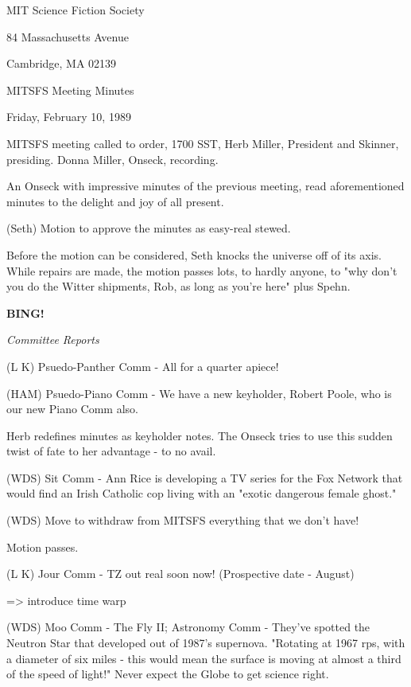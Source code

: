 \documentclass[12pt]{article}
\newcommand{\bing}{{\bf BING!} }
\newcommand{\goto}[1]{\bing \vskip 12pt \centerline{{\em{#1}}}}
\begin{document}
\begin{center}

MIT Science Fiction Society 

84 Massachusetts Avenue

Cambridge, MA 02139

\vspace{12pt}

MITSFS Meeting Minutes 

Friday, February 10, 1989

\end{center}
 
\vspace{18pt}

\setlength{\parskip}{6pt}

\noindent
MITSFS meeting called to order, 1700 SST, Herb Miller, President and Skinner, presiding. Donna Miller, Onseck, recording.

An Onseck with impressive minutes of the previous meeting, read aforementioned minutes to the delight and joy of all present.

(Seth) Motion to approve the minutes as easy-real stewed.  

Before the motion can be considered, Seth knocks the universe off of its axis.  While repairs are made, the motion passes lots, to hardly anyone, to "why don't you do the Witter shipments, Rob, as long as
you're here" plus Spehn.

\goto{Committee Reports}

(L K) Psuedo-Panther Comm - All for a quarter apiece!

(HAM) Psuedo-Piano Comm - We have a new keyholder, Robert Poole, who is our new Piano Comm also.

Herb redefines minutes as keyholder notes. The Onseck tries to use this sudden twist of fate to her advantage - to no avail.

(WDS) Sit Comm - Ann Rice is developing a TV series for the Fox Network that would find an Irish Catholic cop living with an "exotic dangerous female ghost."

(WDS) Move to withdraw from MITSFS everything that we don't have!

Motion passes.

(L K) Jour Comm - TZ out real soon now! (Prospective date - August)

=> introduce time warp

(WDS) Moo Comm - The Fly II; Astronomy Comm - They've spotted the Neutron Star that developed out of 1987's supernova. "Rotating at 1967 rps, with a diameter of six miles - this would mean the surface is moving at almost a third of the speed of light!"  Never expect the Globe to get science right.
\end{document}
